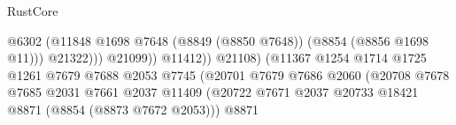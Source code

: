 \begin{lexlean}{RustCore}
\begin{coremodule}
                                                                      @6302
                                                                      (@11848
                                                                        @1698
                                                                        @7648
                                                                        (@8849 (@8850 @7648))
                                                                        (@8854 (@8856 @1698 @11)))
                                                                      @21322)))
                                                                @21099))
                                                            @11412))
                                                        @21108)
                                                      (@11367
                                                        @1254
                                                        @1714
                                                        @1725
                                                        @1261
                                                        @7679
                                                        @7688
                                                        @2053
                                                        @7745
                                                        (@20701
                                                          @7679
                                                          @7686
                                                          @2060
                                                          (@20708
                                                            @7678
                                                            @7685
                                                            @2031
                                                            @7661
                                                            @2037
                                                            @11409
                                                            (@20722
                                                              @7671
                                                              @2037
                                                              @20733
                                                              @18421
                                                              @8871
                                                              (@8854 (@8873 @7672 @2053)))
                                                            @8871

\end{coremodule}
\end{lexlean}
